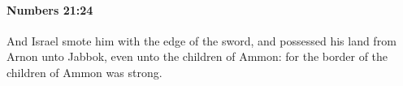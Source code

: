 
		\paragraph{Numbers 21:24} %
			\label{NUMBERS-21-24}

			And Israel smote him with the edge of the sword, and possessed his land from Arnon unto Jabbok, even unto the children of Ammon: for the border of the children of Ammon was strong.


